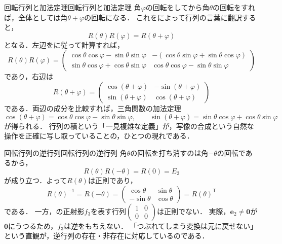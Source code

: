 \begin{example}{回転行列と加法定理}{回転行列と加法定理}
  角$\varphi$の回転をしてから角$\theta$の回転をすれば，全体としては角$\theta + \varphi$の回転になる．
  これをによって行列の言葉に翻訳すると，
  \[
    R(\theta) R(\varphi) = R(\theta + \varphi)
  \]
  となる．左辺をに従って計算すれば，
  \[
    R(\theta)R(\varphi) =
    \begin{pmatrix}
      \cos\theta\cos\varphi - \sin\theta\sin\varphi & -(\cos\theta\sin\varphi + \sin\theta\cos\varphi) \\
      \sin\theta\cos\varphi + \cos\theta\sin\varphi & \cos\theta\cos\varphi - \sin\theta\sin\varphi
    \end{pmatrix}
  \]
  であり，右辺は
  \[
    R(\theta + \varphi) =
    \begin{pmatrix}
      \cos(\theta + \varphi) & -\sin(\theta + \varphi) \\
      \sin(\theta + \varphi) & \cos(\theta + \varphi)
    \end{pmatrix}
  \]
  である．両辺の成分を比較すれば，三角関数の加法定理
  \[
    \cos(\theta + \varphi) = \cos\theta\cos\varphi - \sin\theta\sin\varphi, \qquad
    \sin(\theta + \varphi) = \sin\theta\cos\varphi + \cos\theta\sin\varphi
  \]
  が得られる．
  行列の積という「一見複雑な定義」が，写像の合成という自然な操作を正確に写し取っていることの，ひとつの現れである．
\end{example}

\begin{example}{回転行列の逆行列}{回転行列の逆行列}
  角$\theta$の回転を打ち消すのは角$-\theta$の回転であるから，
  \[
    R(\theta) R(-\theta) = R(0) = E_2
  \]
  が成り立つ．よって$R(\theta)$は正則であり，
  \[
    R(\theta)^{-1} = R(-\theta) = \begin{pmatrix} \cos\theta & \sin\theta \\ -\sin\theta & \cos\theta \end{pmatrix}
    = R(\theta)^\mathsf{T}
  \]
  である．
  一方，の正射影$f_3$を表す行列$\begin{pmatrix} 1 & 0 \\ 0 & 0 \end{pmatrix}$は正則でない．
  実際，$\bm{e}_2 \ne \bm{0}$が$\bm{0}$にうつるため，$f_3$は逆をもちえない．
  「つぶれてしまう変換は元に戻せない」という直観が，逆行列の存在・非存在に対応しているのである．
\end{example}

